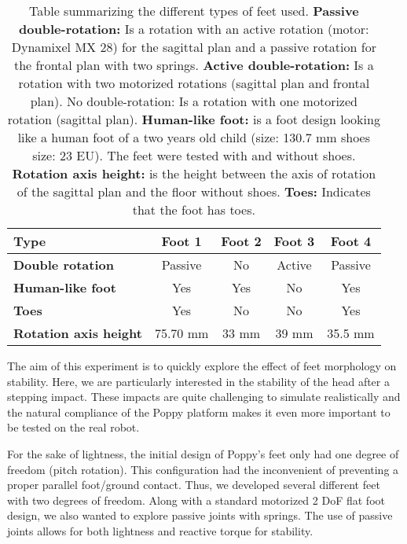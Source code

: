 \begin{table}
    \begin{center}
        \begin{tabular}{|l|c|c|c|c|}
        \hline
        \textbf{Type} & \textbf{Foot 1} & \textbf{Foot 2} & \textbf{Foot 3} & \textbf{Foot 4}\\
        \hline
        \textbf{Double rotation} & Passive & No & Active & Passive\\
        \hline
        \textbf{Human-like foot} & Yes & Yes & No & Yes\\
        \hline
        \textbf{Toes} & Yes & No & No & Yes\\
        \hline
        \textbf{Rotation axis height} & 75.70 mm & 33 mm & 39 mm & 35.5 mm\\
        \hline

        \end{tabular}
        \caption{Table summarizing the different types of feet used. \textbf{Passive double-rotation:} Is a rotation with an active rotation (motor: Dynamixel MX 28) for the sagittal plan and a passive rotation for the frontal plan with two springs. \textbf{Active double-rotation:}  Is a rotation with two motorized rotations (sagittal plan and frontal plan). No double-rotation: Is a rotation with one motorized rotation (sagittal plan). \textbf{Human-like foot:} is a foot design looking like a human foot of a two years old child (size: 130.7 mm shoes size: 23 EU). The feet were tested with and without shoes. \textbf{Rotation axis height:} is the height between the axis of rotation of the sagittal plan and the floor without shoes. \textbf{Toes:} Indicates that the foot has toes.
        }
        \label{tab:table_feet}
    \end{center}
\end{table}

The aim of this experiment is to quickly explore the effect of feet morphology on stability. Here, we are particularly interested in the stability of the head after a stepping impact. These impacts are quite challenging to simulate realistically and the natural compliance of the Poppy platform makes it even more important to be tested on the real robot.

For the sake of lightness, the initial design of Poppy's feet only had one degree of freedom (pitch rotation). This configuration had the inconvenient of preventing a proper parallel foot/ground contact. Thus, we developed several different feet with two degrees of freedom. Along with a standard motorized 2 DoF flat foot design, we also wanted to explore passive joints with springs. The use of passive joints allows for both lightness and reactive torque for stability.


